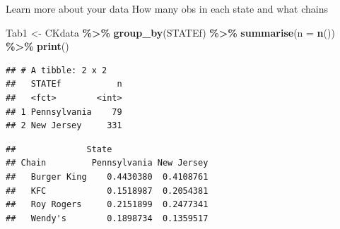 \documentclass[
  ignorenonframetext,
]{beamer}
\newenvironment{Shaded}{\begin{snugshade}}{\end{snugshade}}
\newcommand{\AttributeTok}[1]{\textcolor[rgb]{0.13,0.29,0.53}{#1}}
\newcommand{\DecValTok}[1]{\textcolor[rgb]{0.00,0.00,0.81}{#1}}
\newcommand{\FunctionTok}[1]{\textcolor[rgb]{0.13,0.29,0.53}{\textbf{#1}}}
\newcommand{\NormalTok}[1]{#1}
\newcommand{\OtherTok}[1]{\textcolor[rgb]{0.56,0.35,0.01}{#1}}
\newcommand{\SpecialCharTok}[1]{\textcolor[rgb]{0.81,0.36,0.00}{\textbf{#1}}}
\newcommand{\StringTok}[1]{\textcolor[rgb]{0.31,0.60,0.02}{#1}}
\begin{document}
\begin{frame}[fragile]{Learn more about your data}
\label{learn-more-about-your-data-1}
How many obs in each state and what chains

\scriptsize

\begin{Shaded}
\begin{Highlighting}[]
\NormalTok{Tab1 }\OtherTok{\textless{}{-}}\NormalTok{ CKdata }\SpecialCharTok{\%\textgreater{}\%} \FunctionTok{group\_by}\NormalTok{(STATEf) }\SpecialCharTok{\%\textgreater{}\%} 
          \FunctionTok{summarise}\NormalTok{(}\AttributeTok{n =} \FunctionTok{n}\NormalTok{()) }\SpecialCharTok{\%\textgreater{}\%} 
          \FunctionTok{print}\NormalTok{()}
\end{Highlighting}
\end{Shaded}

\begin{verbatim}
## # A tibble: 2 x 2
##   STATEf           n
##   <fct>        <int>
## 1 Pennsylvania    79
## 2 New Jersey     331
\end{verbatim}

\begin{Shaded}
\end{Shaded}

\begin{verbatim}
##              State
## Chain         Pennsylvania New Jersey
##   Burger King    0.4430380  0.4108761
##   KFC            0.1518987  0.2054381
##   Roy Rogers     0.2151899  0.2477341
##   Wendy's        0.1898734  0.1359517
\end{verbatim}

\normalsize
\end{frame}
\end{document}
